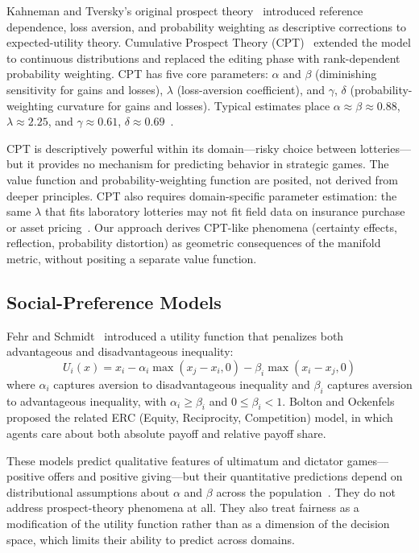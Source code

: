 \documentclass[journal]{IEEEtran}
\begin{document}
Kahneman and Tversky's original prospect theory~\cite{kahneman1979} introduced reference dependence, loss aversion, and probability weighting as descriptive corrections to expected-utility theory.
Cumulative Prospect Theory (CPT)~\cite{tversky1992} extended the model to continuous distributions and replaced the editing phase with rank-dependent probability weighting.
CPT has five core parameters: $\alpha$ and $\beta$ (diminishing sensitivity for gains and losses), $\lambda$ (loss-aversion coefficient), and $\gamma$, $\delta$ (probability-weighting curvature for gains and losses).
Typical estimates place $\alpha \approx \beta \approx 0.88$, $\lambda \approx 2.25$, and $\gamma \approx 0.61$, $\delta \approx 0.69$~\cite{tversky1992}.

CPT is descriptively powerful within its domain---risky choice between lotteries---but it provides no mechanism for predicting behavior in strategic games.
The value function and probability-weighting function are posited, not derived from deeper principles.
CPT also requires domain-specific parameter estimation: the same $\lambda$ that fits laboratory lotteries may not fit field data on insurance purchase or asset pricing~\cite{camerer2003}.
Our approach derives CPT-like phenomena (certainty effects, reflection, probability distortion) as geometric consequences of the manifold metric, without positing a separate value function.

\subsection{Social-Preference Models}

Fehr and Schmidt~\cite{fehr1999} introduced a utility function that penalizes both advantageous and disadvantageous inequality:
\begin{equation}
    U_i(x) = x_i - \alpha_i \max(x_j - x_i, 0) - \beta_i \max(x_i - x_j, 0)
    \label{eq:fehr_schmidt}
\end{equation}
where $\alpha_i$ captures aversion to disadvantageous inequality and $\beta_i$ captures aversion to advantageous inequality, with $\alpha_i \geq \beta_i$ and $0 \leq \beta_i < 1$.
Bolton and Ockenfels~\cite{bolton2000} proposed the related ERC (Equity, Reciprocity, Competition) model, in which agents care about both absolute payoff and relative payoff share.

These models predict qualitative features of ultimatum and dictator games---positive offers and positive giving---but their quantitative predictions depend on distributional assumptions about $\alpha$ and $\beta$ across the population~\cite{camerer2003}.
They do not address prospect-theory phenomena at all.
They also treat fairness as a modification of the utility function rather than as a dimension of the decision space, which limits their ability to predict across domains.
\end{document}
